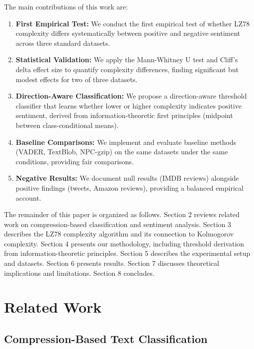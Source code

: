 \documentclass[11pt,letterpaper]{article}
\begin{document}
The main contributions of this work are:

\begin{enumerate}
  \item \textbf{First Empirical Test:} We conduct the first empirical test of whether LZ78 complexity differs systematically between positive and negative sentiment across three standard datasets.

  \item \textbf{Statistical Validation:} We apply the Mann-Whitney U test and Cliff's delta effect size to quantify complexity differences, finding significant but modest effects for two of three datasets.

  \item \textbf{Direction-Aware Classification:} We propose a direction-aware threshold classifier that learns whether lower or higher complexity indicates positive sentiment, derived from information-theoretic first principles (midpoint between class-conditional means).

  \item \textbf{Baseline Comparisons:} We implement and evaluate baseline methods (VADER, TextBlob, NPC-gzip) on the same datasets under the same conditions, providing fair comparisons.

  \item \textbf{Negative Results:} We document null results (IMDB reviews) alongside positive findings (tweets, Amazon reviews), providing a balanced empirical account.
\end{enumerate}

The remainder of this paper is organized as follows. Section 2 reviews related work on compression-based classification and sentiment analysis. Section 3 describes the LZ78 complexity algorithm and its connection to Kolmogorov complexity. Section 4 presents our methodology, including threshold derivation from information-theoretic principles. Section 5 describes the experimental setup and datasets. Section 6 presents results. Section 7 discusses theoretical implications and limitations. Section 8 concludes.

\section{Related Work}

\subsection{Compression-Based Text Classification}
\end{document}
